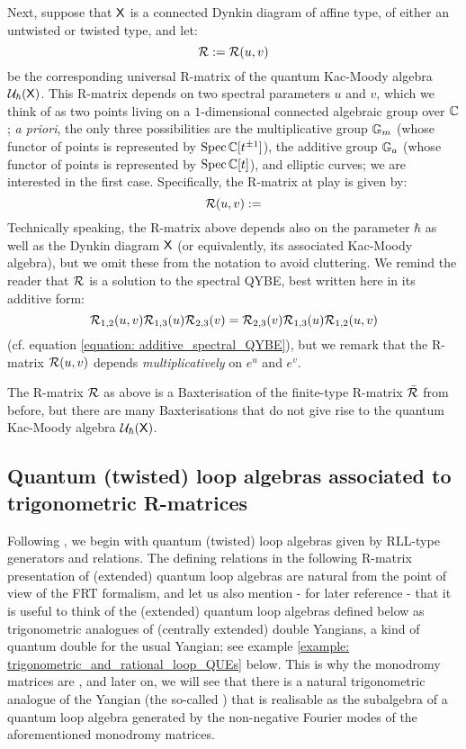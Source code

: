         Next, suppose that $\mathsf{X}$ is a connected Dynkin diagram of affine type, of either an untwisted or twisted type, and let:
            $$\mathcal{R} := \mathcal{R}(u, v)$$
        be the corresponding universal R-matrix of the quantum Kac-Moody algebra $\mathcal{U}_{\hbar}(\mathsf{X})$. This R-matrix depends on two spectral parameters $u$ and $v$, which we think of as two points living on a $1$-dimensional connected algebraic group over $\mathbb{C}$; \textit{a priori}, the only three possibilities are the multiplicative group $\mathbb{G}_m$ (whose functor of points is represented by $\operatorname{Spec} \mathbb{C}[t^{\pm 1}]$), the additive group $\mathbb{G}_a$ (whose functor of points is represented by $\operatorname{Spec} \mathbb{C}[t]$), and elliptic curves; we are interested in the first case. Specifically, the R-matrix at play is given by:
            \begin{equation} \label{equation: affine_QUEs_universal_R_matrices}
                \mathcal{R}(u, v) :=
            \end{equation}
        Technically speaking, the R-matrix above depends also on the parameter $\hbar$ as well as the Dynkin diagram $\mathsf{X}$ (or equivalently, its associated Kac-Moody algebra), but we omit these from the notation to avoid cluttering. We remind the reader that $\mathcal{R}$ is a solution to the spectral QYBE, best written here in its additive form:
            $$\mathcal{R}_{1, 2}(u, v) \mathcal{R}_{1, 3}(u) \mathcal{R}_{2, 3}(v) = \mathcal{R}_{2, 3}(v) \mathcal{R}_{1, 3}(u) \mathcal{R}_{1, 2}(u, v)$$
        (cf. equation \eqref{equation: additive_spectral_QYBE}), but we remark that the R-matrix $\mathcal{R}(u, v)$ depends \textit{multiplicatively} on $e^u$ and $e^v$.
        \begin{remark}
            The R-matrix $\mathcal{R}$ as above is a Baxterisation of the finite-type R-matrix $\bar{\mathcal{R}}$ from before, but there are many Baxterisations that do not give rise to the quantum Kac-Moody algebra $\mathcal{U}_{\hbar}(\mathsf{X})$.
        \end{remark}

    \subsection{Quantum (twisted) loop algebras associated to trigonometric R-matrices}
        Following \cite{guay_regelskis_wendlandt_R_matrix_presentation_of_loop_QUEs}, we begin with quantum (twisted) loop algebras given by RLL-type generators and relations. The defining relations in the following R-matrix presentation of (extended) quantum loop algebras are natural from the point of view of the FRT formalism, and let us also mention - for later reference - that it is useful to think of the (extended) quantum loop algebras defined below as trigonometric analogues of (centrally extended) double Yangians, a kind of quantum double for the usual Yangian; see example \ref{example: trigonometric_and_rational_loop_QUEs} below. This is why the monodromy matrices are , and later on, we will see that there is a natural trigonometric analogue of the Yangian (the so-called ) that is realisable as the subalgebra of a quantum loop algebra generated by the non-negative Fourier modes of the aforementioned monodromy matrices.

